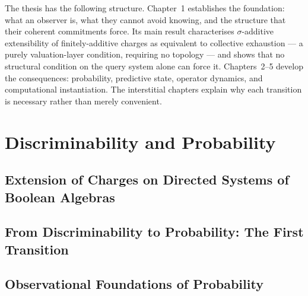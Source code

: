 \documentclass[12pt, oneside]{book}
\theoremstyle{definition}
\theoremstyle{remark}
\begin{document}
The thesis has the following structure.  Chapter~1 establishes the
foundation: what an observer is, what they cannot avoid knowing, and
the structure that their coherent commitments force.  Its main result
characterises $\sigma$-additive extensibility of finitely-additive
charges as equivalent to collective exhaustion --- a purely
valuation-layer condition, requiring no topology --- and shows that no
structural condition on the query system alone can force it.
Chapters~2--5 develop the consequences: probability, predictive state,
operator dynamics, and computational instantiation.
The interstitial chapters explain why each transition is necessary
rather than merely convenient.

\mainmatter

\part{Discriminability and Probability}


\chapter[Extension of Charges on Directed Systems]{Extension of Charges on Directed Systems of Boolean Algebras}
\label{chap:paper-minus-one}




\chapter*{From Discriminability to Probability: The First Transition}
\label{interstitial:minus-one-to-zero}




\chapter{Observational Foundations of Probability}
\label{chap:paper-zero}
\end{document}
